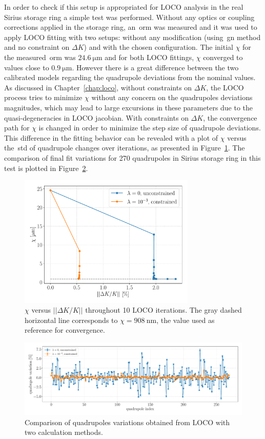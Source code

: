 In order to check if this setup is appropriated for LOCO analysis in the real Sirius storage ring a simple test was performed. Without any optics or coupling corrections applied in the storage ring, an~\gls{orm} was measured and it was used to apply LOCO fitting with two setups: without any modification (using~\gls{gn} method and no constraint on $\Delta K$) and with the chosen configuration. The initial $\chi$ for the measured~\gls{orm} was $\SI{24.6}{\micro\meter}$ and for both LOCO fittings, $\chi$ converged to values close to $\SI{0.9}{\micro\meter}$. However there is a great difference between the two calibrated models regarding the quadrupole deviations from the nominal values. As discussed in Chapter~\ref{chap:loco}, without constraints on $\Delta K$, the LOCO process tries to minimize $\chi$ without any concern on the quadrupoles deviations magnitudes, which may lead to large excursions in these parameters due to the quasi-degeneracies in LOCO jacobian. With constraints on $\Delta K$, the convergence path for $\chi$ is changed in order to minimize the step size of quadrupole deviations. This difference in the fitting behavior can be revealed with a plot of $\chi$ versus the~\gls{std} of quadrupole changes over iterations, as presented in Figure~\ref{fig:chi_vs_dkl}. The comparison of final fit variations for 270 quadrupoles in Sirius storage ring in this test is plotted in Figure~\ref{fig:dkl_compare}. 
\begin{figure}
\centering
\includegraphics[width=0.75\textwidth]{figures/chi_versus_dk_cumsum.pdf}
\caption{$\chi$ versus $||\Delta K/K||$ throughout 10 LOCO iterations. The gray dashed horizontal line corresponds to $\chi = \SI{908}{\nano\meter}$, the value used as reference for convergence.}
\label{fig:chi_vs_dkl}
\end{figure}
\begin{figure}
\centering
\includegraphics[width=1.0\textwidth]{figures/delta_kl_comparison_better_grid.pdf}
\caption{Comparison of quadrupoles variations obtained from LOCO with two calculation methods.}
\label{fig:dkl_compare}
\end{figure}

